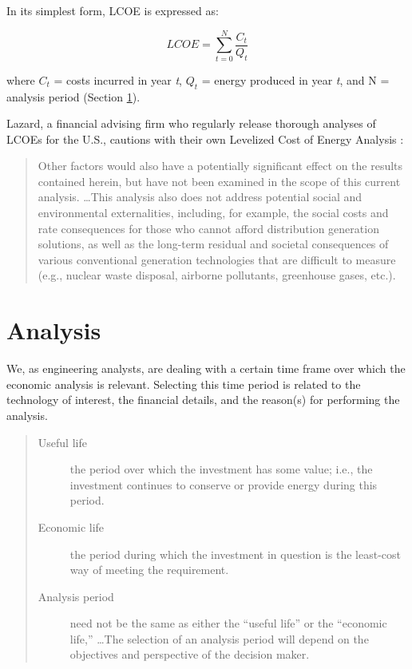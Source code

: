 \documentclass[10pt]{article}
\begin{document}
In its simplest form, LCOE is expressed as:

$$LCOE = \sum_{t=0}^{N} \frac{C_t}{Q_t}$$

where $C_t$ = costs incurred in year \textit{t}, $Q_t$ = energy produced in year \textit{t}, and N = analysis period (Section \ref{an}). \cite{Greenlaw_undated-ok}

Lazard, a financial advising firm who regularly release thorough analyses of LCOEs for the U.S., cautions with their own Levelized Cost of Energy Analysis \cite{lazards12}:

\begin{quote}
    Other factors would also have a potentially significant effect on the results
contained herein, but have not been examined in the scope of this current analysis. \ldots This analysis also does not
address potential social and environmental externalities, including, for example, the social costs and rate consequences for those who cannot
afford distribution generation solutions, as well as the long-term residual and societal consequences of various conventional generation
technologies that are difficult to measure (e.g., nuclear waste disposal, airborne pollutants, greenhouse gases, etc.). \cite{lazards12}
\end{quote}

\section{Analysis}
\label{an}

   {}
\smallskip


We, as engineering analysts, are dealing with a certain time frame over which the economic analysis is relevant. Selecting this time period is related to the technology of interest, the financial details, and the reason(s) for performing the analysis.

\begin{quote}
\begin{description}
\item[Useful life] the period over which the investment has some value; i.e., the investment continues to conserve or provide energy during this period. \cite{Goswami2007-hf}
\item[Economic life] the period during which the investment in question is the least-cost way of meeting the requirement. \cite{Goswami2007-hf}
\item[Analysis period] need not be the same as either the ``useful life'' or the ``economic life,'' \ldots The selection of an analysis period will depend on the objectives and perspective of the decision maker. \cite{Goswami2007-hf}
\end{description}
\end{quote}
\end{document}
